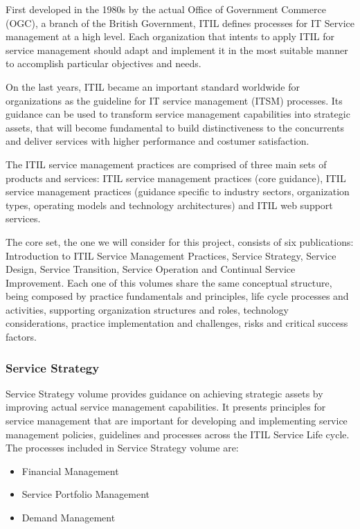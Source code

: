 First developed in the 1980s by the actual Office of Government Commerce (OGC), a branch of the British Government, ITIL defines processes for IT Service management at a high level. Each organization that intents to apply ITIL for service management should adapt and implement it in the most suitable manner to accomplish  particular objectives and needs.\cite{hill2006combine}\par
On the last years, ITIL became an important standard worldwide for organizations as the guideline for IT service management (ITSM) processes. Its guidance can be used to transform service management capabilities into strategic assets, that will become fundamental to build distinctiveness to the concurrents and deliver services with higher performance and costumer satisfaction.\par
The ITIL service management practices are comprised of three main sets of products and services: ITIL service management practices (core guidance), ITIL service management practices (guidance specific to industry sectors, organization types, operating models and technology architectures) and ITIL web support services.\par


The core set, the one we will consider for this project, consists of six publications: Introduction to ITIL Service Management Practices, Service Strategy, Service Design, Service Transition, Service Operation and Continual Service Improvement. Each one of this volumes share the same conceptual structure, being composed by practice fundamentals and principles, life cycle processes and activities, supporting organization structures and roles, technology considerations, practice implementation and challenges, risks and critical success factors.

\subsubsection{Service Strategy} 

Service Strategy volume provides guidance on achieving strategic assets by improving actual service management capabilities. It presents principles for service management that are important for developing and implementing service management policies, guidelines and processes across the ITIL Service Life cycle.\cite{itilSS} The processes included in Service Strategy volume are:

\begin{itemize}
  \item Financial Management
  \item Service Portfolio Management 
  \item Demand Management
\end{itemize}

